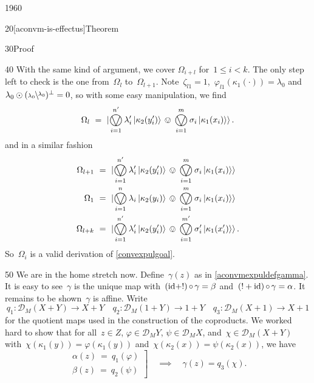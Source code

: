 \begin{parsec}{1960}
\begin{point}{20}[aconvm-is-effectus]{Theorem}
\begin{point}{30}{Proof}
\begin{point}{40}
With the same kind of argument, we cover
    $\Omega_{i+l}$ for~$1 \leq i < k$.
The only step left to check is the one
    from~$\Omega_l$ to~$\Omega_{l+1}$.
Note~$\zeta_{l1}=1$,~$\varphi_{l1}(\kappa_1(\cdot)) = \lambda_0$
and~$\lambda_0 \odot  (\rfrac{\lambda_0}{\lambda_0})^\perp = 0$,
so with some easy manipulation, we find
\begin{equation*}
    \Omega_l \ = \  \ket{
        \bigovee^{n'}_{i=1} \lambda'_i \ket{\kappa_2(y'_i)}
\, \ovee\,  \bigovee^m_{i=1} \sigma_i \ket{\kappa_1(x_i)} }.
\end{equation*}
and in a similar fashion
\begin{align*}
    \Omega_{l+1} & \ = \  \ket{
        \bigovee^{n'}_{i=1} \lambda'_i \ket{\kappa_2(y'_i)}
    \, \ovee\,  \bigovee^m_{i=1} \sigma_i \ket{\kappa_1(x_i)} } \\
    \Omega_{1} & \ = \  \ket{
        \bigovee^{n}_{i=1} \lambda_i \ket{\kappa_2(y_i)}
\,\ovee\, \bigovee^m_{i=1} \sigma_i \ket{\kappa_1(x_i)} } \\
    \Omega_{l+k} & \ = \  \ket{
        \bigovee^{n'}_{i=1} \lambda'_i \ket{\kappa_2(y'_i)}
    \,\ovee\, \bigovee^{m'}_{i=1} \sigma'_i \ket{\kappa_1(x'_i)} }.
\end{align*}
So~$\Omega_i$ is a valid derivation of \eqref{convexpulgoal}.
\end{point}
\begin{point}{50}%
We are in the home stretch now.
Define~$\gamma(z)$ as in \eqref{aconvmexpuldefgamma}.
It is easy to see~$\gamma$
    is the unique map with~$(\mathrm{id}+!) \mathop{\circ} \gamma = \beta$
    and~$(!+\mathrm{id})\mathop{\circ} \gamma = \alpha$.
It remains to be shown~$\gamma$ is affine.
Write
\begin{equation*}
q_1\colon \mathcal{D}_M(X+Y) \to X+Y \quad
q_2\colon \mathcal{D}_M(1+Y) \to 1+Y \quad
q_3\colon \mathcal{D}_M(X+1) \to X+1
\end{equation*}
for the quotient maps used in the construction of the coproducts.
We worked hard to show
that
for all~$z \in Z$, $\varphi \in \mathcal{D}_M Y$,
$\psi \in \mathcal{D}_M X$, 
and~$\chi \in \mathcal{D}_M (X+Y)$
with~$\chi(\kappa_1 (y)) = \varphi(\kappa_1(y))$
and~$\chi(\kappa_2 (x)) = \psi(\kappa_2(x))$,
we have
\begin{equation*}
    \left.\begin{array}{ll}
    \alpha(z)\ =\ q_1(\varphi) \\
    \beta(z)\ =\ q_2(\psi)
    \end{array}\right] \quad \implies \quad
    \gamma(z) = q_3(\chi).
\end{equation*}

\end{point}
\end{point}
\end{point}
\end{parsec}
